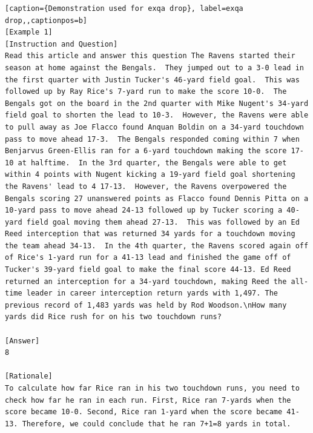 \begin{lstlisting}[caption={Demonstration used for exqa drop}, label=exqa drop,,captionpos=b]
[Example 1]
[Instruction and Question] 
Read this article and answer this question The Ravens started their season at home against the Bengals.  They jumped out to a 3-0 lead in the first quarter with Justin Tucker's 46-yard field goal.  This was followed up by Ray Rice's 7-yard run to make the score 10-0.  The Bengals got on the board in the 2nd quarter with Mike Nugent's 34-yard field goal to shorten the lead to 10-3.  However, the Ravens were able to pull away as Joe Flacco found Anquan Boldin on a 34-yard touchdown pass to move ahead 17-3.  The Bengals responded coming within 7 when Benjarvus Green-Ellis ran for a 6-yard touchdown making the score 17-10 at halftime.  In the 3rd quarter, the Bengals were able to get within 4 points with Nugent kicking a 19-yard field goal shortening the Ravens' lead to 4 17-13.  However, the Ravens overpowered the Bengals scoring 27 unanswered points as Flacco found Dennis Pitta on a 10-yard pass to move ahead 24-13 followed up by Tucker scoring a 40-yard field goal moving them ahead 27-13.  This was followed by an Ed Reed interception that was returned 34 yards for a touchdown moving the team ahead 34-13.  In the 4th quarter, the Ravens scored again off of Rice's 1-yard run for a 41-13 lead and finished the game off of Tucker's 39-yard field goal to make the final score 44-13. Ed Reed returned an interception for a 34-yard touchdown, making Reed the all-time leader in career interception return yards with 1,497. The previous record of 1,483 yards was held by Rod Woodson.\nHow many yards did Rice rush for on his two touchdown runs?

[Answer] 
8

[Rationale]
To calculate how far Rice ran in his two touchdown runs, you need to check how far he ran in each run. First, Rice ran 7-yards when the score became 10-0. Second, Rice ran 1-yard when the score became 41-13. Therefore, we could conclude that he ran 7+1=8 yards in total.




\end{lstlisting}
